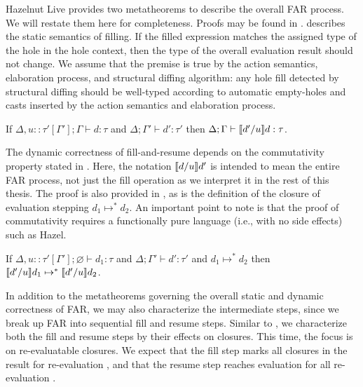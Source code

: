 Hazelnut Live provides two metatheorems to describe the overall FAR process. We will restate them here for completeness. Proofs may be found in \cite{conf/popl/HazelnutLive19}.  describes the static semantics of filling. If the filled expression matches the assigned type of the hole in the hole context, then the type of the overall evaluation result should not change. We assume that the premise is true by the action semantics, elaboration process, and structural diffing algorithm: any hole fill detected by structural diffing should be well-typed according to automatic empty-holes and casts inserted by the action semantics and elaboration process.

\begin{theorem}
  If $\Delta,u::\tau'[\Gamma'];\Gamma\vdash d:\tau$ and $\Delta;\Gamma'\vdash d':\tau'$ then $\Delta;\Gamma\vdash\llbracket{}d'/u\rrbracket{}d:\tau$.
  \label{thm:filling-statics}
\end{theorem}

The dynamic correctness of fill-and-resume depends on the commutativity property stated in . Here, the notation $\llbracket{}d/u\rrbracket{}d'$ is intended to mean the entire FAR process, not just the fill operation as we interpret it in the rest of this thesis. The proof is also provided in \cite{conf/popl/HazelnutLive19}, as is the definition of the closure of evaluation stepping $d_1\mapsto^*d_2$. An important point to note is that the proof of commutativity requires a functionally pure language (i.e., with no side effects) such as Hazel.

\begin{theorem}
  If $\Delta,u::\tau'[\Gamma'];\varnothing\vdash d_1:\tau$ and $\Delta;\Gamma'\vdash d':\tau'$ and $d_1\mapsto^* d_2$ then $\llbracket{}d'/u\rrbracket{}d_1\mapsto^*\llbracket{}d'/u\rrbracket{}d_2$.
  \label{thm:commutativity}
\end{theorem}

In addition to the metatheorems governing the overall static and dynamic correctness of FAR, we may also characterize the intermediate steps, since we break up FAR into sequential fill and resume steps. Similar to , we characterize both the fill and resume steps by their effects on closures. This time, the focus is on re-evaluatable closures. We expect that the fill step marks all closures in the result for re-evaluation , and that the resume step reaches evaluation for all re-evaluation .

